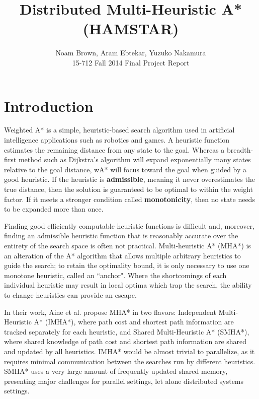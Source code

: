 \documentclass[11pt]{article}
\title{Distributed Multi-Heuristic A* (HAMSTAR)}
\author{Noam Brown, Aram Ebtekar, Yuzuko Nakamura
\\15-712 Fall 2014 Final Project Report}
\begin{document}
\maketitle


\section{Introduction}

Weighted A* is a simple, heuristic-based search algorithm used in artificial intelligence applications such as robotics and games. A heuristic function estimates the remaining distance from any state to the goal. Whereas a breadth-first method such as Dijkstra's algorithm will expand exponentially many states relative to the goal distance, wA* will focus toward the goal when guided by a good heuristic. If the heuristic is \textbf{admissible}, meaning it never overestimates the true distance, then the solution is guaranteed to be optimal to within the weight factor. If it meets a stronger condition called \textbf{monotonicity}, then no state needs to be expanded more than once.

Finding good efficiently computable heuristic functions is difficult and, moreover, finding an admissible heuristic function that is reasonably accurate over the entirety of the search space is often not practical. Multi-heuristic A* (MHA*) \cite{Aine14} is an alteration of the A* algorithm that allows multiple arbitrary heuristics to guide the search; to retain the optimality bound, it is only necessary to use one monotone heuristic, called an ``anchor". Where the shortcomings of each individual heuristic may result in local optima which trap the search, the ability to change heuristics can provide an escape.

In their work, Aine et al. propose MHA* in two flavors: Independent Multi-Heuristic A* (IMHA*), where path cost and shortest path information are tracked separately for each heuristic, and Shared Multi-Heuristic A* (SMHA*), where shared knowledge of path cost and shortest path information are shared and updated by all heuristics. IMHA* would be almost trivial to parallelize, as it requires minimal communication between the searches run by different heuristics. SMHA* uses a very large amount of frequently updated shared memory, presenting major challenges for parallel settings, let alone distributed systems settings.
\end{document}
